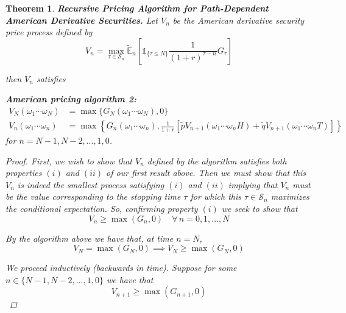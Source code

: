 \documentclass[12pt]{article}
\newtheorem{theorem}{Theorem}
\newlength\tindent
\renewcommand{\indent}{\hspace*{\tindent}}
\newcommand{\E}{\mathbb E}
\begin{document}
\begin{theorem} {\bf Recursive Pricing Algorithm for Path-Dependent American Derivative Securities.} Let $V_n$ be the American derivative security price process defined by
\begin{equation*}
	V_n = \max_{\tau \in \mathcal S_n} \tilde{\E}_n \left[ \mathds 1_{\{\tau \leq N\}} \frac{1}{(1 + r)^{\tau - n}} G_\tau \right]
\end{equation*}

then $V_n$ satisfies

\begin{framed}
{\bf American pricing algorithm 2:} 
\begin{align*}
	V_N(\omega_1\cdots\omega_N) &= \max \{ G_N(\omega_1\cdots\omega_N), 0 \} \\
	V_n(\omega_1\cdots\omega_n) &= \max \left\{ G_n(\omega_1\cdots\omega_n), \frac{1}{1 + r}\left[ \tilde{p}V_{n + 1}(\omega_1\cdots\omega_nH) + \tilde{q}V_{n + 1}(\omega_1\cdots\omega_nT) \right]\right\}
\end{align*}
for $n = N - 1, N - 2,...,1, 0$.
\end{framed}

\begin{proof} First, we wish to show that $V_n$ defined by the algorithm satisfies both properties $(i)$ and $(ii)$ of our first result above. Then we must show that this $V_n$ is indeed the smallest process satisfying $(i)$ and $(ii)$ implying that $V_n$ must be the value corresponding to the stopping time $\tau$ for which this $\tau\in\mathcal S_n$ maximizes the conditional expectation. So, confirming property $(i)$ we seek to show that
\begin{equation*}
	V_n \geq \max(G_n, 0) \quad \forall\, n = 0,1,...,N
\end{equation*}

By the algorithm above we have that, at time $n = N$,
\begin{equation*}
	V_N = \max(G_N, 0) \implies V_N \geq \max(G_N, 0)
\end{equation*}

\indent We proceed inductively (backwards in time). Suppose for some $n \in \{N - 1, N - 2,..., 1, 0\}$ we have that
\begin{equation*}
	V_{n + 1} \geq \max(G_{n + 1}, 0)
\end{equation*}


\end{proof}
\end{theorem}
\end{document}

